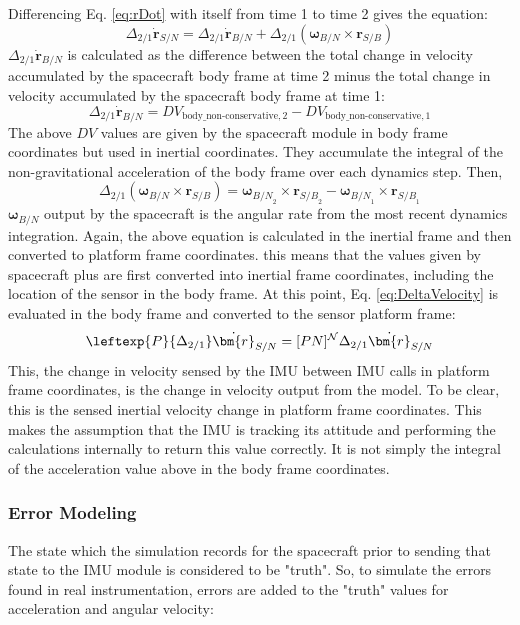 Differencing Eq. \ref{eq:rDot} with itself from time 1 to time 2 gives the equation:
\begin{equation}
	\Delta_{2/1} 	\dot{\bm{r}}_{S/N} = \Delta_{2/1} \dot{\bm{r}}_{B/N} + \Delta_{2/1} (\bm{\omega}_{B/N} \times \bm{r}_{S/B})
	\label{eq:DeltaVelocity}
\end{equation}
$\Delta_{2/1} \dot{\bm{r}}_{B/N}$ is calculated as the difference between the total change in velocity accumulated by the spacecraft body frame at time 2 minus the total change in velocity accumulated by the spacecraft body frame at time 1:
\begin{equation}
\Delta_{2/1} \dot{\bm{r}}_{B/N} = DV_{\textrm{body\_non-conservative},2} - DV_{\textrm{body\_non-conservative},1}
\end{equation}
The above $DV$ values are given by the spacecraft module in body frame coordinates but used in inertial coordinates. They accumulate the integral of the non-gravitational acceleration of the body frame over each dynamics step. Then,
\begin{equation}
	\Delta_{2/1} (\bm{\omega}_{B/N} \times \bm{r}_{S/B}) = \bm{\omega}_{{B/N}_2} \times \bm{r}_{{S/B}_2} - \bm{\omega}_{{B/N}_1} \times \bm{r}_{{S/B}_1}
\end{equation}
$\bm{\omega}_{{B/N}}$ output by the spacecraft is the angular rate from the most recent dynamics integration. Again, the above equation is calculated in the inertial frame and then converted to platform frame coordinates. this means that the values given by spacecraft plus are first converted into inertial frame coordinates, including the location of the sensor in the body frame. At this point, Eq. \ref{eq:DeltaVelocity} is evaluated in the body frame and converted to the sensor platform frame:
\begin{equation}
\leftexp{P} {\Delta_{2/1}} 	\dot{\bm{r}}_{S/N} = [PN] ^{\mathcal{N}} \Delta_{2/1} 	\dot{\bm{r}}_{S/N}
\end{equation}
This, the change in velocity sensed by the IMU between IMU calls in platform frame coordinates, is the change in velocity output from the model. To be clear, this is the sensed inertial velocity change in platform frame coordinates. This makes the assumption that the IMU is tracking its attitude and performing the calculations internally to return this value correctly. It is not simply the integral of the acceleration value above in the body frame coordinates.

\subsubsection{Error Modeling}
The state which the simulation records for the spacecraft prior to sending that state to the IMU module is considered to be "truth". So, to simulate the errors found in real instrumentation, errors are added to the "truth" values for acceleration and angular velocity:

